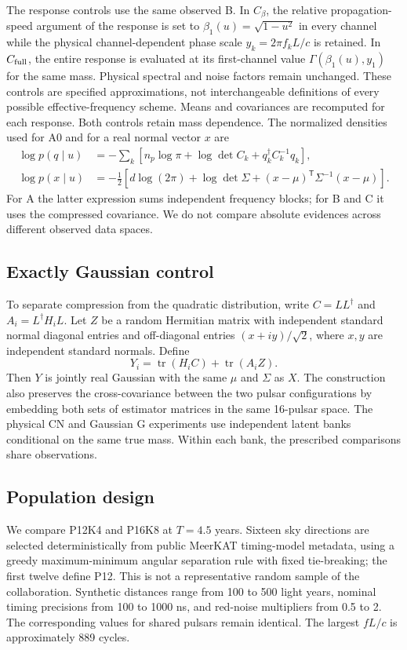 \documentclass[11pt,a4paper]{article}
\begin{document}
The response controls use the same observed B. In $C_\beta$, the relative propagation-speed argument of the response is set to $\beta_1(u)=\sqrt{1-u^2}$ in every channel while the physical channel-dependent phase scale $y_k=2\pi f_kL/c$ is retained. In $C_{\rm full}$, the entire response is evaluated at its first-channel value $\Gamma(\beta_1(u),y_1)$ for the same mass. Physical spectral and noise factors remain unchanged. These controls are specified approximations, not interchangeable definitions of every possible effective-frequency scheme. Means and covariances are recomputed for each response. Both controls retain mass dependence. The normalized densities used for A0 and for a real normal vector $x$ are
\begin{align}
 \log p(q\mid u)&=-\sum_k[n_p\log\pi+\log\det C_k+q_k^\dagger C_k^{-1}q_k],\\
 \log p(x\mid u)&=-\tfrac12[d\log(2\pi)+\log\det\Sigma+
 (x-\mu)^{\mathsf T}\Sigma^{-1}(x-\mu)].
\end{align}
For A the latter expression sums independent frequency blocks; for B and C it uses the compressed covariance. We do not compare absolute evidences across different observed data spaces.

\subsection{Exactly Gaussian control}
To separate compression from the quadratic distribution, write $C=LL^\dagger$ and $A_i=L^\dagger H_iL$. Let $Z$ be a random Hermitian matrix with independent standard normal diagonal entries and off-diagonal entries $(x+iy)/\sqrt2$, where $x,y$ are independent standard normals. Define
\begin{equation}
 Y_i=\operatorname{tr}(H_iC)+\operatorname{tr}(A_iZ).
\end{equation}
Then $Y$ is jointly real Gaussian with the same $\mu$ and $\Sigma$ as $X$. The construction also preserves the cross-covariance between the two pulsar configurations by embedding both sets of estimator matrices in the same 16-pulsar space. The physical CN and Gaussian G experiments use independent latent banks conditional on the same true mass. Within each bank, the prescribed comparisons share observations.

\subsection{Population design}
We compare P12K4 and P16K8 at $T=4.5$ years. Sixteen sky directions are selected deterministically from public MeerKAT timing-model metadata, using a greedy maximum-minimum angular separation rule with fixed tie-breaking; the first twelve define P12. This is not a representative random sample of the collaboration. Synthetic distances range from 100 to 500 light years, nominal timing precisions from 100 to 1000 ns, and red-noise multipliers from 0.5 to 2. The corresponding values for shared pulsars remain identical. The largest $fL/c$ is approximately 889 cycles.
\end{document}
